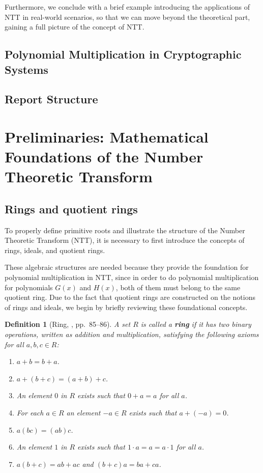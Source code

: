 \documentclass[12pt]{article}
\newtheorem{definition}{Definition}[section]
\begin{document}
Furthermore, 
we conclude with a brief example introducing the applications of NTT in real-world scenarios, 
so that we can move beyond the theoretical part, gaining a full picture of the concept of NTT.

\subsection{Polynomial Multiplication in Cryptographic Systems}

\subsection{Report Structure}

\section{Preliminaries: Mathematical Foundations of the Number Theoretic Transform}

\subsection{Rings and quotient rings}

To properly define primitive roots and illustrate the structure of the Number Theoretic Transform (NTT), 
it is necessary to first introduce the concepts of rings, ideals, and quotient rings. 

These algebraic structures are needed because they provide the foundation for polynomial multiplication in NTT, 
since in order to do polynomial multiplication for polynomials $G(x)$ and $H(x)$, 
both of them must belong to the same quotient ring. 
Due to the fact that quotient rings are constructed on the notions of rings and ideals, 
we begin by briefly reviewing these foundational concepts.

\begin{definition}[Ring, \cite{algebra}, pp.~85--86]
    A set $R$ is called a \textbf{ring} if it has two binary operations, written as addition and multiplication, 
    satisfying the following axioms for all $a, b, c \in R$:
    \begin{enumerate}
        \item $a + b = b + a$.
        \item $a + (b + c) = (a + b) + c$.
        \item An element $0$ in $R$ exists such that $0 + a = a$ for all $a$.
        \item For each $a \in R$ an element $-a \in R$ exists such that $a + (-a) = 0$.
        \item $a(bc) = (ab)c$.
        \item An element $1$ in $R$ exists such that $1 \cdot a = a = a \cdot 1$ for all $a$.
        \item $a (b + c) = ab + ac$ and $(b + c)a = ba + ca$.
    \end{enumerate}
\end{definition}
\end{document}
